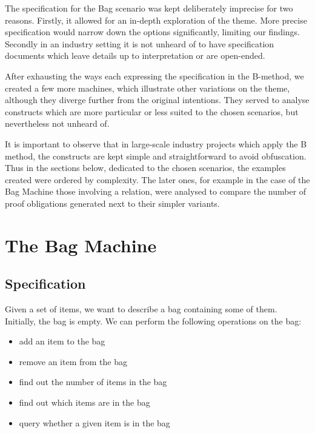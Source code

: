 \documentclass[12pt,journal,duplex]{IEEEtran}
\begin{document}
	The specification for the Bag scenario was kept deliberately imprecise for two reasons. Firstly, it allowed for an in-depth exploration of the theme. More precise specification would narrow down the options significantly, limiting our findings. Secondly in an industry setting it is not unheard of to have specification documents which leave details up to interpretation or are open-ended.

	After exhausting the ways each expressing the specification in the B-method, we created a few more machines, which illustrate other variations on the theme, although they diverge further from the original intentions. They served to analyse constructs which are more particular or less suited to the chosen scenarios, but nevertheless not unheard of.

	It is important to observe that in large-scale industry projects which apply the B method, the constructs are kept simple and straightforward to avoid obfuscation. Thus in the sections below, dedicated to the chosen scenarios, the examples created were ordered by complexity. The later ones, for example in the case of the Bag Machine those involving a relation, were analysed to compare the number of proof obligations generated next to their simpler variants.

	\section{The Bag Machine}
	\subsection{Specification}
	Given a set of items, we want to describe a bag containing some of them. Initially, the bag is empty. We can perform the following operations on the bag:
	\begin{itemize}
		\item add an item to the bag
		\item remove an item from the bag
		\item find out the number of items in the bag
		\item find out which items are in the bag
		\item query whether a given item is in the bag
	\end{itemize}
\end{document}
